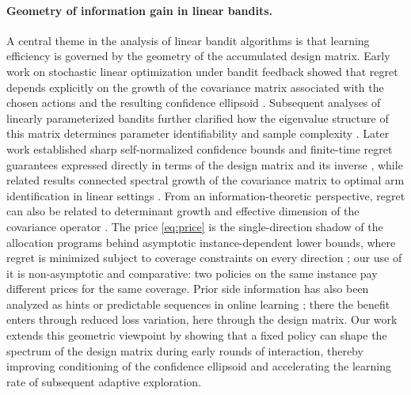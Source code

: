 \documentclass{article}
\theoremstyle{definition}
\theoremstyle{remark}
\theoremstyle{remark}
\begin{document}
\paragraph{Geometry of information gain in linear bandits.}
A central theme in the analysis of linear bandit algorithms is that learning
efficiency is governed by the geometry of the accumulated design matrix.
Early work on stochastic linear optimization under bandit feedback showed
that regret depends explicitly on the growth of the covariance matrix
associated with the chosen actions and the resulting confidence ellipsoid
\cite{dani2008stochastic}. Subsequent analyses of linearly parameterized
bandits further clarified how the eigenvalue structure of this matrix
determines parameter identifiability and sample complexity
\cite{rusmevichientong2010linearly}. Later work established sharp
self-normalized confidence bounds and finite-time regret guarantees
expressed directly in terms of the design matrix and its inverse
\cite{abbasi2011improved}, while related results connected spectral growth
of the covariance matrix to optimal arm identification in linear settings
\cite{soare2014best}. From an information-theoretic perspective, regret can
also be related to determinant growth and effective dimension of the
covariance operator \cite{srinivas2012information,valko2013finite}. The
price \eqref{eq:price} is the single-direction shadow of the allocation
programs behind asymptotic instance-dependent lower bounds, where regret is
minimized subject to coverage constraints on every direction
\cite{graves1997asymptotically,lattimore2017end}; our use of it is
non-asymptotic and comparative: two policies on the same instance pay
different prices for the same coverage. Prior side information has also been
analyzed as hints or predictable sequences in online learning
\cite{rakhlin2013online,cutkosky2022leveraging}; there the benefit enters
through reduced loss variation, here through the design matrix. Our
work extends this geometric viewpoint by showing that a fixed policy can
shape the spectrum of the design matrix during early rounds of interaction,
thereby improving conditioning of the confidence ellipsoid and accelerating
the learning rate of subsequent adaptive exploration.
\end{document}
